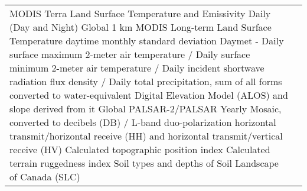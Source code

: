 \documentclass[times,final]{elsarticle.cls}
\begin{document}
{\begin{longtable}{|p{33mm}|p{94mm}|}
                    	MODIS Terra Land Surface Temperature and Emissivity Daily (Day and Night) Global 1 km
                    	\newline \newline
                    	MODIS Long-term Land Surface Temperature daytime monthly standard deviation
                    	\newline\newline
                    	Daymet - Daily surface maximum 2-meter air temperature / Daily surface minimum 2-meter air temperature / Daily incident shortwave radiation flux density / Daily total precipitation, sum of all forms converted to water-equivalent
                    	\newline \newline
                    	Digital Elevation Model (ALOS) and slope derived from it
                    	\newline \newline
                    	Global PALSAR-2/PALSAR Yearly Mosaic, converted to decibels (DB) / 
                        L-band duo-polarization horizontal transmit/horizontal receive (HH) and horizontal transmit/vertical receive (HV)
                        \newline \newline
                        Calculated topographic position index \cite{2}
                        \newline \newline
                        Calculated terrain ruggedness index \cite{3}
                        \newline \newline
                        Soil types and depths of Soil Landscape of Canada (SLC) 
                        \\






\end{longtable}}
\end{document}

